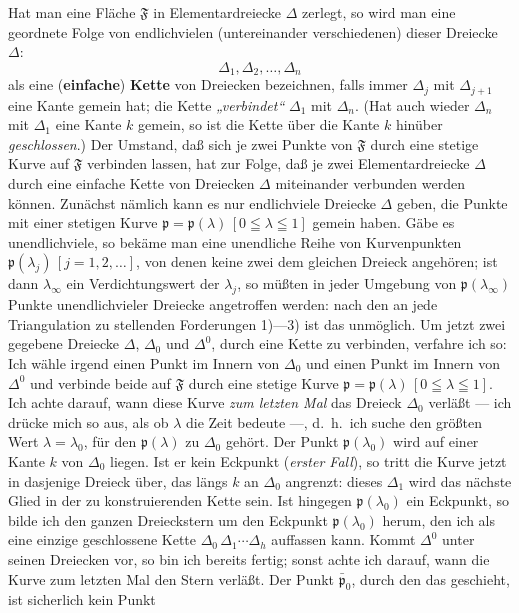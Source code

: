 \documentclass{article}
\begin{document}
Hat man eine Fläche $\mathfrak{F}$ in Elementardreiecke $\Delta$ zerlegt, so wird man eine geordnete Folge von endlichvielen (untereinander verschiedenen) dieser Dreiecke $\Delta$:
\[
\Delta_1, \Delta_2, \dots, \Delta_n
\]
als eine (\textbf{einfache}) \textbf{Kette} von Dreiecken bezeichnen, falls immer $\Delta_j$ mit $\Delta_{j+1}$ eine Kante gemein hat; die Kette \emph{„verbindet“} $\Delta_1$ mit $\Delta_n$. (Hat auch wieder $\Delta_n$ mit $\Delta_1$ eine Kante $k$ gemein, so ist die Kette über die Kante $k$ hinüber \emph{geschlossen}.) Der Umstand, daß sich je zwei Punkte von $\mathfrak{F}$ durch eine stetige Kurve auf $\mathfrak{F}$ verbinden lassen, hat zur Folge, daß je zwei Elementardreiecke $\Delta$ durch eine einfache Kette von Dreiecken $\Delta$ miteinander verbunden werden können. Zunächst nämlich kann es nur endlichviele Dreiecke $\Delta$ geben, die Punkte mit einer stetigen Kurve $\mathfrak{p} = \mathfrak{p}(\lambda)\,[0 \leqq \lambda \leqq 1]$ gemein haben. Gäbe es unendlichviele, so bekäme man eine unendliche Reihe von Kurvenpunkten $\mathfrak{p}(\lambda_j)\,[j = 1, 2, \dots]$, von denen keine zwei dem gleichen Dreieck angehören; ist dann $\lambda_\infty$ ein Verdichtungswert der $\lambda_j$, so müßten in jeder Umgebung von $\mathfrak{p}(\lambda_\infty)$ Punkte unendlichvieler Dreiecke angetroffen werden: nach den an jede Triangulation zu stellenden Forderungen 1)---3) ist das unmöglich. Um jetzt zwei gegebene Dreiecke $\Delta$, $\Delta_0$ und $\Delta^0$, durch eine Kette zu verbinden, verfahre ich so: Ich wähle irgend einen Punkt im Innern von $\Delta_0$ und einen Punkt im Innern von $\Delta^0$ und verbinde beide auf $\mathfrak{F}$ durch eine stetige Kurve $\mathfrak{p} = \mathfrak{p}(\lambda)\,[0 \leqq \lambda \leqq 1]$. Ich achte darauf, wann diese Kurve \emph{zum letzten Mal} das Dreieck $\Delta_0$ verläßt --- ich drücke mich so aus, als ob $\lambda$ die Zeit bedeute ---, d.\ h.\ ich suche den größten Wert $\lambda = \lambda_0$, für den $\mathfrak{p}(\lambda)$ zu $\Delta_0$ gehört. Der Punkt $\mathfrak{p}(\lambda_0)$ wird auf einer Kante $k$ von $\Delta_0$ liegen. Ist er kein Eckpunkt (\emph{erster Fall}), so tritt die Kurve jetzt in dasjenige Dreieck über, das längs $k$ an $\Delta_0$ angrenzt: dieses $\Delta_1$ wird das nächste Glied in der zu konstruierenden Kette sein. Ist hingegen $\mathfrak{p}(\lambda_0)$ ein Eckpunkt, so bilde ich den ganzen Dreieckstern um den Eckpunkt $\mathfrak{p}(\lambda_0)$ herum, den ich als eine einzige geschlossene Kette $\Delta_0\,\Delta_1 \cdots \Delta_h$ auffassen kann. Kommt $\Delta^0$ unter seinen Dreiecken vor, so bin ich bereits fertig; sonst achte ich darauf, wann die Kurve zum letzten Mal den Stern verläßt. Der Punkt $\bar{\mathfrak{p}}_0$, durch den das geschieht, ist sicherlich kein Punkt
\end{document}
